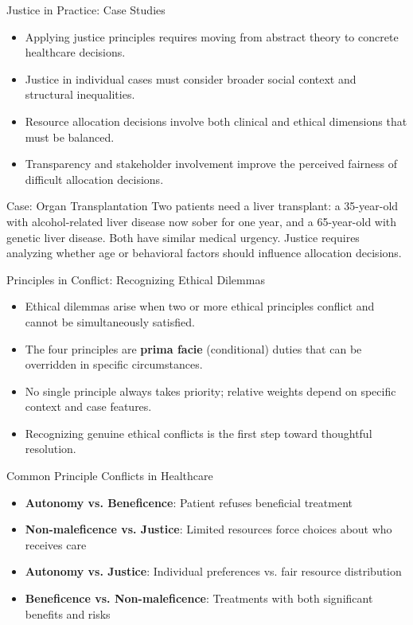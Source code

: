 \documentclass{beamer}
\begin{document}
	\begin{frame}{Justice in Practice: Case Studies}
		\begin{itemize}
			\item Applying justice principles requires moving from abstract theory to concrete healthcare decisions.
			\item Justice in individual cases must consider broader social context and structural inequalities.
			\item Resource allocation decisions involve both clinical and ethical dimensions that must be balanced.
			\item Transparency and stakeholder involvement improve the perceived fairness of difficult allocation decisions.
		\end{itemize}
		
		\begin{exampleblock}{Case: Organ Transplantation}
			Two patients need a liver transplant: a 35-year-old with alcohol-related liver disease now sober for one year, and a 65-year-old with genetic liver disease. Both have similar medical urgency. Justice requires analyzing whether age or behavioral factors should influence allocation decisions.
		\end{exampleblock}
	\end{frame}
	
	\begin{frame}{Principles in Conflict: Recognizing Ethical Dilemmas}
		\begin{itemize}
			\item Ethical dilemmas arise when two or more ethical principles conflict and cannot be simultaneously satisfied.
			\item The four principles are \textbf{prima facie} (conditional) duties that can be overridden in specific circumstances.
			\item No single principle always takes priority; relative weights depend on specific context and case features.
			\item Recognizing genuine ethical conflicts is the first step toward thoughtful resolution.
		\end{itemize}
		
		\begin{block}{Common Principle Conflicts in Healthcare}
			\scriptsize
			\begin{itemize}
				\item \textbf{Autonomy vs. Beneficence}: Patient refuses beneficial treatment
				\item \textbf{Non-maleficence vs. Justice}: Limited resources force choices about who receives care
				\item \textbf{Autonomy vs. Justice}: Individual preferences vs. fair resource distribution
				\item \textbf{Beneficence vs. Non-maleficence}: Treatments with both significant benefits and risks
			\end{itemize}
		\end{block}
	\end{frame}
	
\end{document}
